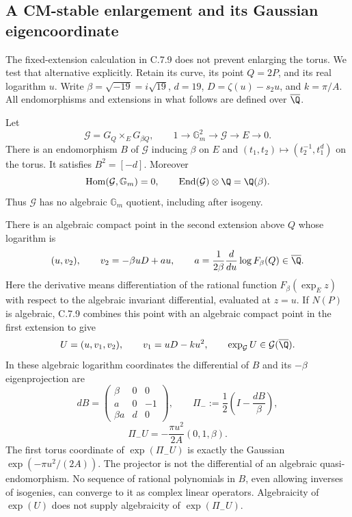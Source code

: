 \subsection{A CM-stable enlargement and its Gaussian eigencoordinate}

The fixed-extension calculation in C.7.9 does not prevent
enlarging the torus. We test that alternative explicitly.
Retain its curve, its point $Q=2P$, and its real logarithm
$u$. Write $\beta=\sqrt{-19}=i\sqrt{19}$, $d=19$,
$D=\zeta(u)-s_2u$, and $k=\pi/A$. All endomorphisms and
extensions in what follows are defined over $\overline\Q$.

\begin{proposition}\label{ari:C.7.10}
Let
\[
 \mathcal G=G_Q\mathbin{\times_E}G_{\beta Q},\qquad
 1\longrightarrow\mathbb G_m^2\longrightarrow\mathcal G
       \longrightarrow E\longrightarrow0.
\]
There is an endomorphism $B$ of $\mathcal G$ inducing
$\beta$ on $E$ and
$(t_1,t_2)\mapsto(t_2^{-1},t_1^d)$ on the torus.
It satisfies $B^2=[-d]$. Moreover
\[
 \operatorname{Hom}(\mathcal G,\mathbb G_m)=0,
 \qquad
 \operatorname{End}(\mathcal G)\otimes\Q=\Q(\beta).
\]
Thus $\mathcal G$ has no algebraic $\mathbb G_m$ quotient,
including after isogeny.

There is an algebraic compact point in the second extension
above $Q$ whose logarithm is
\[
 (u,v_2),\qquad v_2=-\beta uD+au,
 \qquad
 a=\frac1{2\beta}
       \frac{d}{du}\log F_\beta(Q)\in\overline\Q.
\]
Here the derivative means differentiation of the rational
function $F_\beta(\exp_E z)$ with respect to the algebraic
invariant differential, evaluated at $z=u$.
If $N(P)$ is algebraic, C.7.9 combines this point with an
algebraic compact point in the first extension to give
\[
 U=(u,v_1,v_2),\qquad v_1=uD-ku^2,
 \qquad \exp_{\mathcal G}U\in\mathcal G(\overline\Q).
\]
In these algebraic logarithm coordinates the differential of
$B$ and its $-\beta$ eigenprojection are
\[
 dB=\begin{pmatrix}
 \beta&0&0\\ a&0&-1\\ \beta a&d&0
 \end{pmatrix},\qquad
 \Pi_-:=\frac12\left(I-\frac{dB}{\beta}\right),
\]
\[
 \Pi_-U=-\frac{\pi u^2}{2A}(0,1,\beta).
\]
The first torus coordinate of $\exp(\Pi_-U)$ is exactly
the Gaussian $\exp(-\pi u^2/(2A))$. The projector is not
the differential of an algebraic quasi-endomorphism. No
sequence of rational polynomials in $B$, even allowing
inverses of isogenies, can converge to it as complex linear
operators. Algebraicity of $\exp(U)$ does not supply
algebraicity of $\exp(\Pi_-U)$.
\end{proposition}
